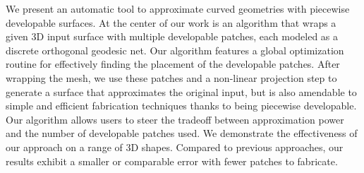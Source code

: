 We present an automatic tool to approximate curved geometries with piecewise developable surfaces. At the center of our work is an algorithm that wraps a given 3D input surface with multiple developable patches, each modeled as a discrete orthogonal geodesic net.
Our algorithm features a global optimization routine for effectively finding the placement of the developable patches. After wrapping the mesh, we use these patches and a non-linear projection step to generate a surface that approximates the original input, but is also amendable to simple and efficient fabrication techniques thanks to being piecewise developable. Our algorithm allows users to steer the tradeoff between approximation power and the number of developable patches used. 
We demonstrate the effectiveness of our approach on a range of 3D shapes. Compared to previous approaches, our results exhibit a smaller or comparable error with fewer 
patches to fabricate.

